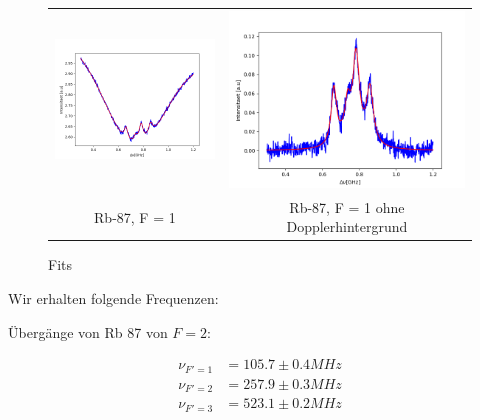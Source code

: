 \documentclass[a4paper,parskip]{scrartcl}
\begin{document}
\begin{figure}[p]
\begin{tabular}{cc}
    \includegraphics[scale = 0.45]{./saturation/peak4/fit.png}  &  \includegraphics[scale = 0.45]{./saturation/peak4/gaussCorrected.png}  \\
    {\footnotesize Rb-87, F = 1} &  {\footnotesize Rb-87, F = 1 ohne Dopplerhintergrund}  \\
\end{tabular}
\caption{Fits}
\label{fig:Abbildung1}
\end{figure}

Wir erhalten folgende Frequenzen:

Übergänge von Rb 87 von $F=2$:

\begin{align*}
\nu_{F'=1} &= 105.7 \pm 0.4 MHz \\
\nu_{F'=2} &= 257.9 \pm 0.3 MHz \\
\nu_{F'=3} &= 523.1 \pm 0.2 MHz  
\end{align*}
\end{document}
